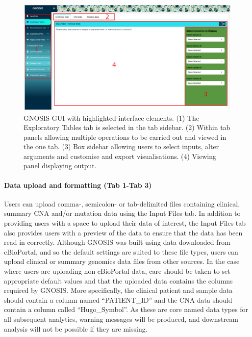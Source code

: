 \begin{figure}[!h]
\center
\includegraphics[width=1\textwidth]{../figures/Chapter_3/GNOSIS_Pic.png}
\caption[GNOSIS GUI with highlighted interface elements.]{GNOSIS GUI with highlighted interface elements. (1) The Exploratory Tables tab is selected in the tab sidebar. (2) Within tab panels allowing multiple operations to be carried out and viewed in the one tab. (3) Box sidebar allowing users to select inputs, alter arguments and customise and export visualisations. (4) Viewing panel displaying output.}
\label{GNOSIS_Tab1}
\end{figure}

\paragraph{Data upload and formatting (Tab 1-Tab 3)}
\hfill

\noindent Users can upload comma-, semicolon- or tab-delimited files containing clinical, summary CNA and/or mutation data using the Input Files tab. In addition to providing users with a space to upload their data of interest, the Input Files tab also provides users with a preview of the data to ensure that the data has been read in correctly. Although GNOSIS was built using data downloaded from cBioPortal, and so the default settings are suited to these file types, users can upload clinical or summary genomics data files from other sources. In the case where users are uploading non-cBioPortal data, care should be taken to set appropriate default values and that the uploaded data contains the columns required by GNOSIS. More specifically, the clinical patient and sample data should contain a column named “PATIENT\_ID” and the CNA data should contain a column called “Hugo\_Symbol”. As these are core named data types for all subsequent analytics, warning messages will be produced, and downstream analysis will not be possible if they are missing.  

